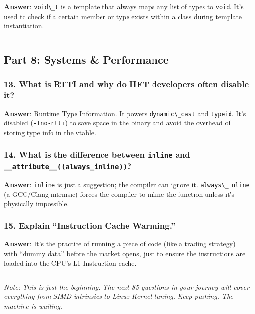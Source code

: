 \textbf{Answer}: \passthrough{\lstinline!void\_t!} is a template that
always maps any list of types to \passthrough{\lstinline!void!}. It's
used to check if a certain member or type exists within a class during
template instantiation.

\begin{center}\rule{0.5\linewidth}{0.5pt}\end{center}

\hypertarget{part-8-systems-performance}{%
\subsection{Part 8: Systems \&
Performance}\label{part-8-systems-performance}}

\hypertarget{what-is-rtti-and-why-do-hft-developers-often-disable-it}{%
\subsubsection{13. What is RTTI and why do HFT developers often disable
it?}\label{what-is-rtti-and-why-do-hft-developers-often-disable-it}}

\textbf{Answer}: Runtime Type Information. It powers
\passthrough{\lstinline!dynamic\_cast!} and
\passthrough{\lstinline!typeid!}. It's disabled
(\passthrough{\lstinline!-fno-rtti!}) to save space in the binary and
avoid the overhead of storing type info in the vtable.

\hypertarget{what-is-the-difference-between-inline-and-__attribute__always_inline}{%
\subsubsection{\texorpdfstring{14. What is the difference between
\texttt{inline} and
\texttt{\_\_attribute\_\_((always\_inline))}?}{14. What is the difference between inline and \_\_attribute\_\_((always\_inline))?}}\label{what-is-the-difference-between-inline-and-__attribute__always_inline}}

\textbf{Answer}: \passthrough{\lstinline!inline!} is just a suggestion;
the compiler can ignore it. \passthrough{\lstinline!always\_inline!} (a
GCC/Clang intrinsic) forces the compiler to inline the function unless
it's physically impossible.

\hypertarget{explain-instruction-cache-warming.}{%
\subsubsection{15. Explain ``Instruction Cache
Warming.''}\label{explain-instruction-cache-warming.}}

\textbf{Answer}: It's the practice of running a piece of code (like a
trading strategy) with ``dummy data'' before the market opens, just to
ensure the instructions are loaded into the CPU's L1-Instruction cache.

\begin{center}\rule{0.5\linewidth}{0.5pt}\end{center}

\emph{Note: This is just the beginning. The next 85 questions in your
journey will cover everything from SIMD intrinsics to Linux Kernel
tuning. Keep pushing. The machine is waiting.}
